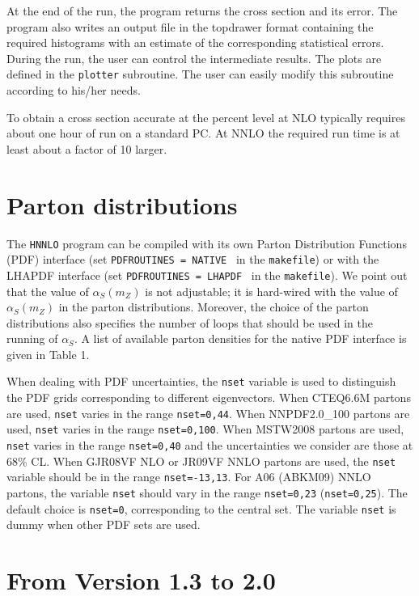 \documentclass[12pt]{article}
\begin{document}
At the end of the run, the program returns the cross section and its error.
The program also writes an output file in the topdrawer format
containing the required histograms with an estimate of the corresponding
statistical errors. During the run, the user can control
the intermediate results.
The plots are defined in the {\tt plotter} subroutine.
The user can easily modify this subroutine according to his/her needs.

To obtain a cross section accurate at the percent level at NLO typically
requires about one hour of run on a standard PC.
At NNLO the required run time is at least about a factor of 10 larger.


\section{Parton distributions}

The {\tt HNNLO} program can be compiled with its own Parton Distribution
Functions (PDF) interface (set {\tt PDFROUTINES = NATIVE}~ in the 
{\tt makefile}) 
or with the LHAPDF interface 
(set {\tt PDFROUTINES = LHAPDF} ~in the {\tt makefile}).
We point out that the value of $\alpha_S(m_Z)$ is not adjustable; it is hard-wired with the
value of $\alpha_S(m_Z)$ in the parton distributions.
Moreover, the choice of the parton distributions also specifies
the number of loops that should be used in the running of $\alpha_S$.
A list of available parton densities for the native PDF interface is given 
in Table 1.

When dealing with PDF uncertainties,
the {\tt nset} variable is used to distinguish the PDF grids corresponding
to different eigenvectors.
When CTEQ6.6M partons are used, {\tt nset} varies in the range {\tt nset=0,44}.
When NNPDF2.0\_100 partons are used, {\tt nset} varies in the range {\tt nset=0,100}.
When MSTW2008 partons are used, {\tt nset} varies in the range {\tt nset=0,40} and the uncertainties we consider are those at 68\% CL.
When GJR08VF NLO or JR09VF NNLO partons are used, the {\tt nset} variable should
be in the range {\tt nset=-13,13}.
For A06 (ABKM09) NNLO partons, the variable {\tt nset}
should vary in the range {\tt nset=0,23} ({\tt nset=0,25}).
The default choice is {\tt nset=0}, corresponding to the central set. 
The variable {\tt nset} is dummy when other PDF sets are used.

\section{From Version 1.3 to 2.0}
\end{document}
